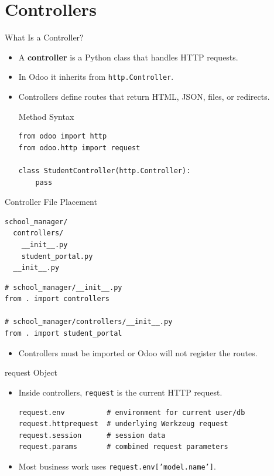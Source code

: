 \section{Controllers}


\begin{frame}[fragile]{What Is a Controller?}
	\begin{itemize}
		\item A \textbf{controller} is a Python class that handles HTTP requests.
		\item In Odoo it inherits from \texttt{http.Controller}.
		\item Controllers define routes that return HTML, JSON, files, or redirects.
\begin{block}{Method Syntax}
\begin{lstlisting}
from odoo import http
from odoo.http import request

class StudentController(http.Controller):
	pass
\end{lstlisting}
\end{block}
	\end{itemize}
\end{frame}

\begin{frame}[fragile]{Controller File Placement}
\begin{lstlisting}
school_manager/
  controllers/
	__init__.py
	student_portal.py
  __init__.py
\end{lstlisting}
\begin{lstlisting}
# school_manager/__init__.py
from . import controllers

# school_manager/controllers/__init__.py
from . import student_portal
\end{lstlisting}
	\begin{itemize}
		\item Controllers must be imported or Odoo will not register the routes.
	\end{itemize}
\end{frame}

\begin{frame}[fragile]{request Object}
	\begin{itemize}
		\item Inside controllers, \texttt{request} is the current HTTP request.
\begin{lstlisting}
request.env          # environment for current user/db
request.httprequest  # underlying Werkzeug request
request.session      # session data
request.params       # combined request parameters
\end{lstlisting}
		\item Most business work uses \texttt{request.env['model.name']}.
	\end{itemize}
\end{frame}

